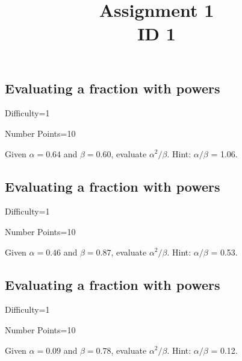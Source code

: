 \documentclass{article}
\title{Assignment 1 \\ ID 1}
\begin{document}
\maketitle

\section{} 



\subsection{Evaluating a fraction with powers}

Difficulty=1

Number Points=10

Given $\alpha = 0.64$ and $\beta = 0.60$, evaluate $\alpha^{2}/\beta$. Hint: $\alpha/\beta$ = 1.06.

\subsection{Evaluating a fraction with powers}

Difficulty=1

Number Points=10

Given $\alpha = 0.46$ and $\beta = 0.87$, evaluate $\alpha^{2}/\beta$. Hint: $\alpha/\beta$ = 0.53.

\subsection{Evaluating a fraction with powers}

Difficulty=1

Number Points=10

Given $\alpha = 0.09$ and $\beta = 0.78$, evaluate $\alpha^{2}/\beta$. Hint: $\alpha/\beta$ = 0.12.
\end{document}
